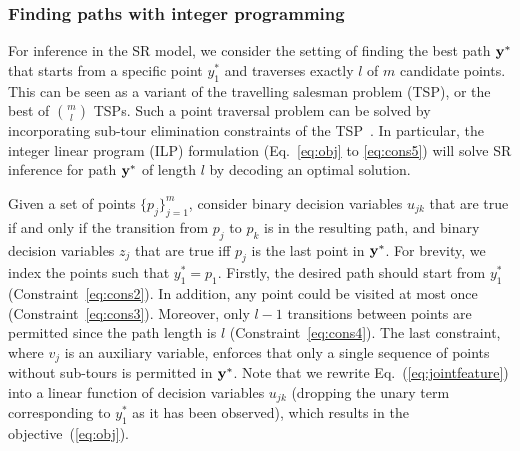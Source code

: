 \subsubsection{Finding paths with integer programming}
For inference in the SR model, 
we consider the setting of finding the best path $\mathbf{y}^*$ that starts from a specific point $y_1^*$ and traverses exactly $l$ of $m$ candidate points.
This can be seen as a variant of the travelling salesman problem (TSP), or the best of ${m \choose l}$ TSPs.
Such a point traversal problem can be solved by incorporating
sub-tour elimination constraints of the TSP~\cite{ijcai15,cikm16paper}.
In particular, the integer linear program (ILP) formulation (Eq.~\ref{eq:obj} to \ref{eq:cons5})
will solve SR inference for path $\mathbf{y}^*$ of length $l$ by decoding an optimal solution.

Given a set of points $\{p_j\}_{j=1}^m$, 
consider binary decision variables $u_{jk}$ that are true if and only if
the transition from $p_j$ to $p_k$ is in the resulting path,
and binary decision variables $z_j$ that are true iff $p_j$ is the last point in $\mathbf{y}^*$.
For brevity, we index the points such that $y_1^* = p_1$.
Firstly, the desired path should start from $y_1^*$ (Constraint~\ref{eq:cons2}).
In addition, any point could be visited at most once (Constraint~\ref{eq:cons3}).
Moreover, only $l-1$ transitions between points are permitted
since the path length is $l$ (Constraint~\ref{eq:cons4}).
The last constraint, where $v_j$ is an auxiliary variable,
enforces that only a single sequence of points without sub-tours is permitted in $\mathbf{y}^*$.
Note that we rewrite Eq.~(\ref{eq:jointfeature}) into a linear function of decision variables $u_{jk}$
(dropping the unary term corresponding to $y_1^*$ as it has been observed), which results in the objective~(\ref{eq:obj}).

